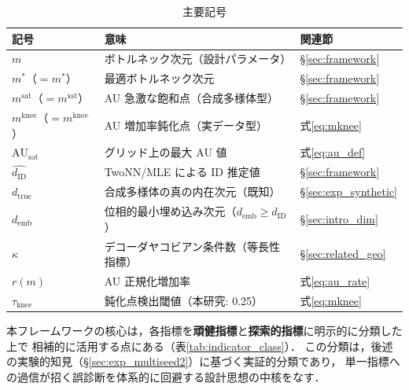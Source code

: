\documentclass[11pt,a4paper]{jsarticle}
\newcommand{\dID}{d_{\mathrm{ID}}}
\newcommand{\dzopt}{m^*}
\newcommand{\dtrue}{d_{\mathrm{true}}}
\newcommand{\kap}{\kappa}
\newcommand{\AUsat}{\mathrm{AU}_{\mathrm{sat}}}
\newcommand{\dzsat}{m^{\mathrm{sat}}}
\newcommand{\mknee}{m^{\mathrm{knee}}}
\newcommand{\demb}{d_{\mathrm{emb}}}
\begin{document}
\begin{table}[H]
\centering
\caption{主要記号}
\label{tab:notation}
\small
\begin{tabular}{lll}
\toprule
記号 & 意味 & 関連節 \\
\midrule
$m$ & ボトルネック次元（設計パラメータ） & §\ref{sec:framework} \\
$\dzopt$（$= m^*$） & 最適ボトルネック次元 & §\ref{sec:framework} \\
$\dzsat$（$= m^{\mathrm{sat}}$） & AU 急激な飽和点（合成多様体型） & §\ref{sec:framework} \\
$\mknee$（$= m^{\mathrm{knee}}$） & AU 増加率鈍化点（実データ型） & 式\eqref{eq:mknee} \\
$\AUsat$ & グリッド上の最大 AU 値 & 式\eqref{eq:au_def} \\
$\hat{\dID}$ & TwoNN/MLE による ID 推定値 & §\ref{sec:framework} \\
$\dtrue$ & 合成多様体の真の内在次元（既知） & §\ref{sec:exp_synthetic} \\
$\demb$ & 位相的最小埋め込み次元（$\demb \geq \dID$） & §\ref{sec:intro_dim} \\
$\kap$ & デコーダヤコビアン条件数（等長性指標） & §\ref{sec:related_geo} \\
$r(m)$ & AU 正規化増加率 & 式\eqref{eq:au_rate} \\
$\tau_{\mathrm{knee}}$ & 鈍化点検出閾値（本研究: 0.25） & 式\eqref{eq:mknee} \\
\bottomrule
\end{tabular}
\end{table}

本フレームワークの核心は，各指標を\textbf{頑健指標}と\textbf{探索的指標}に明示的に分類した上で
相補的に活用する点にある（表\ref{tab:indicator_class}）．
この分類は，後述の実験的知見（§\ref{sec:exp_multiseed2}）に基づく実証的分類であり，
単一指標への過信が招く誤診断を体系的に回避する設計思想の中核をなす．
\end{document}
